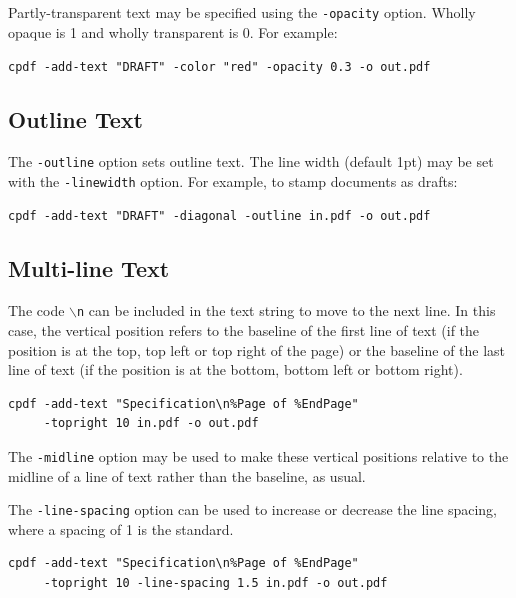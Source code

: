 \documentclass{book}
\begin{document}
\noindent Partly-transparent text may be specified using the \verb!-opacity! option. Wholly opaque is 1 and wholly transparent is 0. For example:

\begin{framed}
  \noindent\small\verb!cpdf -add-text "DRAFT" -color "red" -opacity 0.3 -o out.pdf!
\end{framed}

\subsection{Outline Text}

  The \texttt{-outline} option sets outline text. The line width (default 1pt)
  may be set with the \texttt{-linewidth} option. For example, to stamp
  documents as drafts:

  \begin{framed}
    \noindent\small\verb!cpdf -add-text "DRAFT" -diagonal -outline in.pdf -o out.pdf!
    
  \end{framed}

\subsection{Multi-line Text}

The code \texttt{$\backslash$n} can be included in the text string to move to
the next line. In this case, the vertical position refers to the baseline of
the first line of text (if the position is at the top, top left or top right of
the page) or the baseline of the last line of text (if the position is at the
bottom, bottom left or bottom right).

  \begin{framed}
    \noindent\small\begin{verbatim}
cpdf -add-text "Specification\n%Page of %EndPage"
     -topright 10 in.pdf -o out.pdf\end{verbatim}
  \end{framed}

\noindent The \texttt{-midline} option may be used to make these vertical positions
relative to the midline of a line of text rather than the baseline, as usual.

The \texttt{-line-spacing} option can be used to increase or decrease the line
spacing, where a spacing of 1 is the standard.

  \begin{framed}
    \noindent\small\begin{verbatim}
cpdf -add-text "Specification\n%Page of %EndPage"
     -topright 10 -line-spacing 1.5 in.pdf -o out.pdf\end{verbatim}
  \end{framed}
\end{document}
